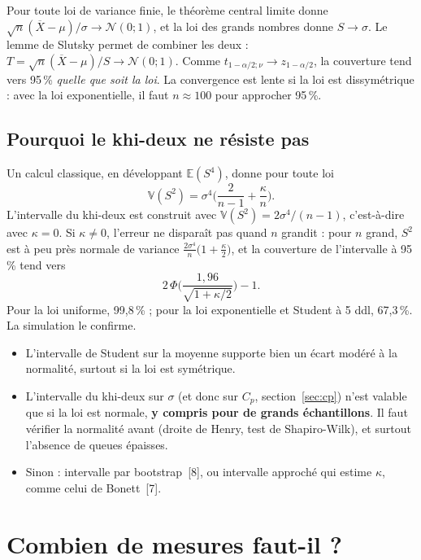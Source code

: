 \documentclass[11pt,a4paper]{article}
\theoremstyle{sj}
\theoremstyle{definition}
\theoremstyle{remark}
\newcommand{\E}{\mathbb{E}}
\newcommand{\V}{\mathbb{V}}
\newcommand{\N}{\mathcal{N}}
\newcommand{\Xb}{\overline{X}}
\begin{document}
Pour toute loi de variance finie, le théorème central limite donne $\sqrt n(\Xb-\mu)/\sigma\to\N(0;1)$, et la loi des grands nombres donne $S\to\sigma$. Le lemme de Slutsky permet de combiner les deux : $T=\sqrt n(\Xb-\mu)/S\to\N(0;1)$. Comme $t_{1-\alpha/2;\nu}\to z_{1-\alpha/2}$, la couverture tend vers 95\,\% \emph{quelle que soit la loi}. La convergence est lente si la loi est dissymétrique : avec la loi exponentielle, il faut $n\approx100$ pour approcher 95\,\%.

\subsection{Pourquoi le khi-deux ne résiste pas}

Un calcul classique, en développant $\E(S^4)$, donne pour toute loi
\[
\V(S^2)=\sigma^4\Big(\frac{2}{n-1}+\frac{\kappa}{n}\Big).
\]
L'intervalle du khi-deux est construit avec $\V(S^2)=2\sigma^4/(n-1)$, c'est-à-dire avec $\kappa=0$. Si $\kappa\ne0$, l'erreur ne disparaît pas quand $n$ grandit : pour $n$ grand, $S^2$ est à peu près normale de variance $\frac{2\sigma^4}{n}\big(1+\frac\kappa2\big)$, et la couverture de l'intervalle à 95\,\% tend vers
\[
2\,\Phi\Big(\frac{1{,}96}{\sqrt{1+\kappa/2}}\Big)-1.
\]
Pour la loi uniforme, 99,8\,\% ; pour la loi exponentielle et Student à 5 ddl, 67,3\,\%. La simulation le confirme.

\begin{essentiel}
\begin{itemize}[leftmargin=1.2em]
\item L'intervalle de Student sur la moyenne supporte bien un écart modéré à la normalité, surtout si la loi est symétrique.
\item L'intervalle du khi-deux sur $\sigma$ (et donc sur $C_p$, section~\ref{sec:cp}) n'est valable que si la loi est normale, \textbf{y compris pour de grands échantillons}. Il faut vérifier la normalité avant (droite de Henry, test de Shapiro-Wilk), et surtout l'absence de queues épaisses.
\item Sinon : intervalle par bootstrap~[8], ou intervalle approché qui estime $\kappa$, comme celui de Bonett~[7].
\end{itemize}
\end{essentiel}

\section{Combien de mesures faut-il ?}\label{sec:taille}
\end{document}
